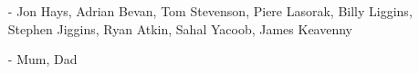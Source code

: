 \clearpage


\begin{acknowledgements}
\begin{itemize}
\item[-] Jon Hays, Adrian Bevan, Tom Stevenson, Piere Lasorak, Billy Liggins, Stephen Jiggins, Ryan Atkin, Sahal Yacoob, James Keavenny
\item[-] Mum, Dad
\end{itemize}
\end{acknowledgements}
\clearpage
